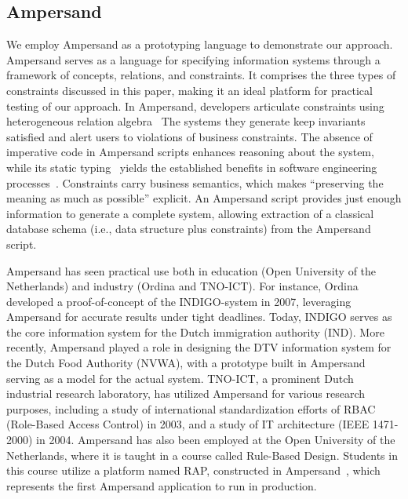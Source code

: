 \documentclass[runningheads]{llncs}
\newcommand{\ourtheory}{approach}
\begin{document}
\subsection{Ampersand}
   We employ Ampersand as a prototyping language to demonstrate our \ourtheory{}.
   Ampersand serves as a language for specifying information systems through a framework of concepts, relations, and constraints.
   It comprises the three types of constraints discussed in this paper, making it an ideal platform for practical testing of our \ourtheory{}.
   In Ampersand, developers articulate constraints using heterogeneous relation algebra~\cite{Hattensperger1999,Alloy2006}
   The systems they generate keep invariants satisfied and alert users to violations of business constraints.
   The absence of imperative code in Ampersand scripts enhances reasoning about the system,
   while its static typing~\cite{vdWoude2011} yields the established benefits in software engineering processes~\cite{HanenbergKRTS14,Petersen2014}.
   Constraints carry business semantics, which makes ``preserving the meaning as much as possible'' explicit.
   An Ampersand script provides just enough information to generate a complete system,
   allowing extraction of a classical database schema (i.e., data structure plus constraints) from the Ampersand script.

   Ampersand has seen practical use both in education (Open University of the Netherlands) and industry (Ordina and TNO-ICT).
   For instance, Ordina developed a proof-of-concept of the INDIGO-system in 2007,
   leveraging Ampersand for accurate results under tight deadlines.
   Today, INDIGO serves as the core information system for the Dutch immigration authority (IND).
   More recently, Ampersand played a role in designing the DTV information system for the Dutch Food Authority (NVWA),
   with a prototype built in Ampersand serving as a model for the actual system.
   TNO-ICT, a prominent Dutch industrial research laboratory, has utilized Ampersand for various research purposes,
   including a study of international standardization efforts of RBAC (Role-Based Access Control) in 2003,
   and a study of IT architecture (IEEE 1471-2000)\cite{IEEE1471} in 2004.
   Ampersand has also been employed at the Open University of the Netherlands,
   where it is taught in a course called Rule-Based Design\cite{RBD}.
   Students in this course utilize a platform named RAP, constructed in Ampersand~\cite{Michels2015},
   which represents the first Ampersand application to run in production.
\end{document}
